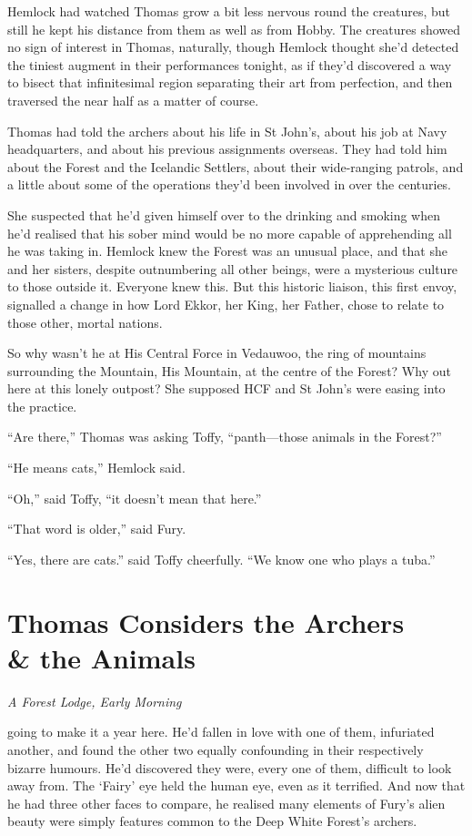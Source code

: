 \documentclass[11pt,a5paper]{article}
\newcommand{\alet}[1]{\textit{#1}\vspace{1em}}
\begin{document}
Hemlock had watched Thomas grow a bit less nervous round the creatures, but still he kept his distance from them as well as from Hobby. The creatures showed no sign of interest in Thomas, naturally, though Hemlock thought she'd detected the tiniest augment in their performances tonight, as if they'd discovered a way to bisect that infinitesimal region separating their art from perfection, and then traversed the near half as a matter of course.

Thomas had told the archers about his life in St John's, about his job at Navy headquarters, and about his previous assignments overseas. They had told him about the Forest and the Icelandic Settlers, about their wide-ranging patrols, and a little about some of the operations they'd been involved in over the centuries.

She suspected that he'd given himself over to the drinking and smoking when he'd realised that his sober mind would be no more capable of apprehending all he was taking in. Hemlock knew the Forest was an unusual place, and that she and her sisters, despite outnumbering all other beings, were a mysterious culture to those outside it. Everyone knew this. But this historic liaison, this first envoy, signalled a change in how Lord Ekkor, her King, her Father, chose to relate to those other, mortal nations.

So why wasn't he at His Central Force in Vedauwoo, the ring of mountains surrounding the Mountain, His Mountain, at the centre of the Forest? Why out here at this lonely outpost? She supposed HCF and St John's were easing into the practice.

``Are there,'' Thomas was asking Toffy, ``panth---those animals in the Forest?''

``He means cats,'' Hemlock said.

``Oh,'' said Toffy, ``it doesn't mean that here.''

``That word is older,'' said Fury.

``Yes, there are cats.'' said Toffy cheerfully. ``We know one who plays a tuba.''

\newpage

\section{Thomas Considers the Archers\\ \& the Animals}

\alet{A Forest Lodge, Early Morning}

 going to make it a year here. He'd fallen in love with one of them, infuriated another, and found the other two equally confounding in their respectively bizarre humours. He'd discovered they were, every one of them, difficult to look away from. The `Fairy' eye held the human eye, even as it terrified. And now that he had three other faces to compare, he realised many elements of Fury's alien beauty were simply features common to the Deep White Forest's archers.
\end{document}
